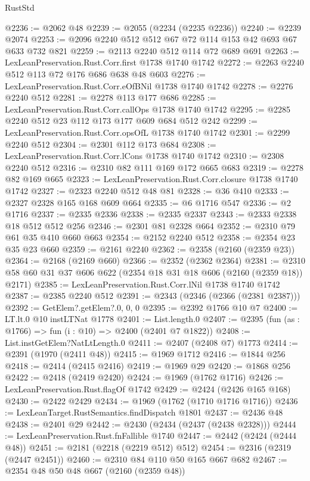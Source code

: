 \begin{lexlean}{RustStd}
\begin{coremodule}
@2236 := @2062 @48
@2239 := @2055 (@2234 (@2235 @2236))
@2240 := @2239 @2074
@2253 := @2096 @2240 @512 @512 @67 @72 @114 @153 @42 @693 @67 @633 @732 @821
@2259 := @2113 @2240 @512 @114 @72 @689 @691
@2263 := LexLeanPreservation.Rust.Corr.first @1738 @1740 @1742
@2272 := @2263 @2240 @512 @113 @72 @176 @686 @638 @48 @603
@2276 := LexLeanPreservation.Rust.Corr.eOfBNil @1738 @1740 @1742
@2278 := @2276 @2240 @512
@2281 := @2278 @113 @177 @686
@2285 := LexLeanPreservation.Rust.Corr.callOps @1738 @1740 @1742
@2295 := @2285 @2240 @512 @23 @112 @173 @177 @609 @684 @512 @242
@2299 := LexLeanPreservation.Rust.Corr.opsOfL @1738 @1740 @1742
@2301 := @2299 @2240 @512
@2304 := @2301 @112 @173 @684
@2308 := LexLeanPreservation.Rust.Corr.lCons @1738 @1740 @1742
@2310 := @2308 @2240 @512
@2316 := @2310 @82 @111 @169 @172 @665 @683
@2319 := @2278 @82 @169 @665
@2323 := LexLeanPreservation.Rust.Corr.closure @1738 @1740 @1742
@2327 := @2323 @2240 @512 @48 @81
@2328 := @36 @410
@2333 := @2327 @2328 @165 @168 @609 @664
@2335 := @6 @1716 @547
@2336 := @2 @1716
@2337 := @2335 @2336
@2338 := @2335 @2337
@2343 := @2333 @2338 @18 @512 @512 @256
@2346 := @2301 @81 @2328 @664
@2352 := @2310 @79 @61 @35 @410 @660 @663
@2354 := @2152 @2240 @512
@2358 := @2354 @23 @35 @23 @660
@2359 := @2161 @2240
@2362 := @2358 (@2160 (@2359 @23))
@2364 := @2168 (@2169 @660)
@2366 := @2352 (@2362 @2364)
@2381 := @2310 @58 @60 @31 @37 @606 @622 (@2354 @18 @31 @18 @606 (@2160 (@2359 @18)) @2171)
@2385 := LexLeanPreservation.Rust.Corr.lNil @1738 @1740 @1742
@2387 := @2385 @2240 @512
@2391 := @2343 (@2346 (@2366 (@2381 @2387)))
@2392 := GetElem?.getElem?.{0, 0, 0}
@2395 := @2392 @1766 @10 @7
@2400 := LT.lt.{0} @10 instLTNat @1778
@2401 := List.length.{0}
@2407 := @2395 (fun (as : @1766) => fun (i : @10) => @2400 (@2401 @7 @1822))
@2408 := List.instGetElem?NatLtLength.{0}
@2411 := @2407 (@2408 @7) @1773
@2414 := @2391 (@1970 (@2411 @48))
@2415 := @1969 @1712
@2416 := @1844 @256
@2418 := @2414 (@2415 @2416)
@2419 := @1969 @29
@2420 := @1868 @256
@2422 := @2418 (@2419 @2420)
@2424 := @1969 (@1762 @1716)
@2426 := LexLeanPreservation.Rust.flagOf @1742
@2429 := @2424 (@2426 @165 @168)
@2430 := @2422 @2429
@2434 := @1969 (@1762 (@1710 @1716 @1716))
@2436 := LexLeanTarget.RustSemantics.findDispatch @1801
@2437 := @2436 @48
@2438 := @2401 @29
@2442 := @2430 (@2434 (@2437 (@2438 @2328)))
@2444 := LexLeanPreservation.Rust.fnFallible @1740
@2447 := @2442 (@2424 (@2444 @48))
@2451 := @2181 (@2218 (@2219 @512) @512)
@2454 := @2316 (@2319 (@2447 @2451))
@2460 := @2310 @84 @110 @50 @165 @667 @682
@2467 := @2354 @48 @50 @48 @667 (@2160 (@2359 @48))

\end{coremodule}
\end{lexlean}
